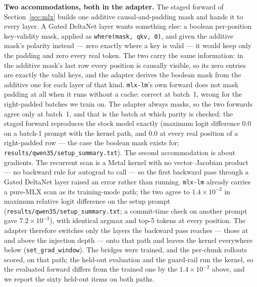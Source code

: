 \documentclass[11pt]{article}
\newcommand{\code}[1]{\texttt{#1}}
\begin{document}
\textbf{Two accommodations, both in the adapter.} The staged forward of Section~\ref{sec:mlx} builds one additive causal-and-padding mask and hands it to every layer. A Gated DeltaNet layer wants something else: a boolean per-position key-validity mask, applied as \code{where(mask, qkv, 0)}, and given the additive mask's polarity instead --- zero exactly where a key is valid --- it would keep only the padding and zero every real token. The two carry the same information: in the additive mask's last row every position is causally visible, so its zero entries are exactly the valid keys, and the adapter derives the boolean mask from the additive one for each layer of that kind. \code{mlx-lm}'s own forward does not mask padding at all when it runs without a cache: correct at batch~1, wrong for the right-padded batches we train on. The adapter always masks, so the two forwards agree only at batch~1, and that is the batch at which parity is checked: the staged forward reproduces the stock model exactly (maximum logit difference $0.0$ on a batch-1 prompt with the kernel path, and $0.0$ at every real position of a right-padded row --- the case the boolean mask exists for; \code{results/qwen35/setup\_summary.txt}). The second accommodation is about gradients. The recurrent scan is a Metal kernel with no vector--Jacobian product --- no backward rule for autograd to call --- so the first backward pass through a Gated DeltaNet layer raised an error rather than running. \code{mlx-lm} already carries a pure-MLX scan as its training-mode path; the two agree to $1.4\times10^{-2}$ in maximum relative logit difference on the setup prompt (\code{results/qwen35/setup\_summary.txt}; a commit-time check on another prompt gave $7.2\times10^{-3}$), with identical argmax and top-5 tokens at every position. The adapter therefore switches only the layers the backward pass reaches --- those at and above the injection depth --- onto that path and leaves the kernel everywhere below (\code{set\_grad\_window}). The bridges were trained, and the per-chunk rollouts scored, on that path; the held-out evaluation and the guard-rail run the kernel, so the evaluated forward differs from the trained one by the $1.4\times10^{-2}$ above, and we report the sixty held-out items on both paths.
\end{document}
